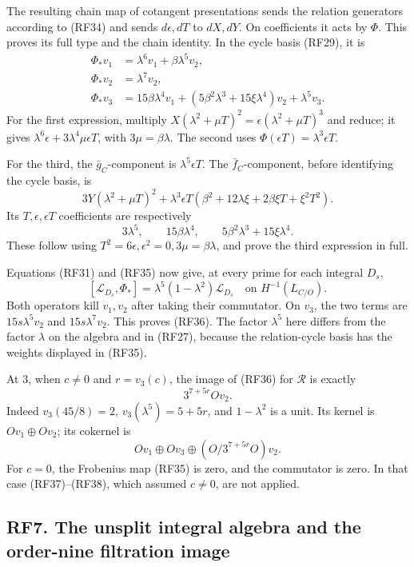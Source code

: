 \documentclass[
]{article}
\begin{document}
The resulting chain map of cotangent presentations sends the relation
generators according to (RF34) and sends \(d\epsilon,dT\) to \(dX,dY\).
On coefficients it acts by \(\Phi\). This proves its full type and the
chain identity. In the cycle basis (RF29), it is \[
\begin{aligned}
\Phi_*v_1&=\lambda^6v_1+\beta\lambda^5v_2,\\
\Phi_*v_2&=\lambda^7v_2,\\
\Phi_*v_3&=15\beta\lambda^4v_1
+(5\beta^2\lambda^3+15\xi\lambda^4)v_2+\lambda^5v_3.
\end{aligned}
\tag{RF35}
\] For the first expression, multiply \(X(\lambda^2+\mu T)^2
=\epsilon(\lambda^2+\mu T)^3\) and reduce; it gives
\(\lambda^6\epsilon+3\lambda^4\mu\epsilon T\), with
\(3\mu=\beta\lambda\). The second uses
\(\Phi(\epsilon T)=\lambda^3\epsilon T\).

For the third, the \(\bar g_C\)-component is \(\lambda^5\epsilon T\).
The \(\bar f_C\)-component, before identifying the cycle basis, is \[
3Y(\lambda^2+\mu T)^2
+\lambda^3\epsilon T
\left(\beta^2+12\lambda\xi+2\beta\xi T+\xi^2T^2\right).
\] Its \(T,\epsilon,\epsilon T\) coefficients are respectively \[
3\lambda^5,\qquad15\beta\lambda^4,\qquad
5\beta^2\lambda^3+15\xi\lambda^4.
\] These follow using \(T^2=6\epsilon,\epsilon^2=0,3\mu=\beta\lambda\),
and prove the third expression in full.

Equations (RF31) and (RF35) now give, at every prime for each integral
\(D_s\), \[
[\mathcal L_{D_s},\Phi_*]
=\lambda^5(1-\lambda^2)\mathcal L_{D_s}
\quad\text{on }H^{-1}(L_{C/O}).
\tag{RF36}
\] Both operators kill \(v_1,v_2\) after taking their commutator. On
\(v_3\), the two terms are \(15s\lambda^5v_2\) and \(15s\lambda^7v_2\).
This proves (RF36). The factor \(\lambda^5\) here differs from the
factor \(\lambda\) on the algebra and in (RF27), because the
relation-cycle basis has the weights displayed in (RF35).

At 3, when \(c\ne0\) and \(r=v_3(c)\), the image of (RF36) for
\(\mathcal R\) is exactly \[
3^{7+5r}Ov_2.
\tag{RF37}
\] Indeed \(v_3(45/8)=2\), \(v_3(\lambda^5)=5+5r\), and \(1-\lambda^2\)
is a unit. Its kernel is \(Ov_1\oplus Ov_2\); its cokernel is \[
Ov_1\oplus Ov_3\oplus(O/3^{7+5r}O)v_2.
\tag{RF38}
\] For \(c=0\), the Frobenius map (RF35) is zero, and the commutator is
zero. In that case (RF37)--(RF38), which assumed \(c\ne0\), are not
applied.

\subsection{RF7. The unsplit integral algebra and the order-nine
filtration
image}\label{rf7.-the-unsplit-integral-algebra-and-the-order-nine-filtration-image}
\end{document}
